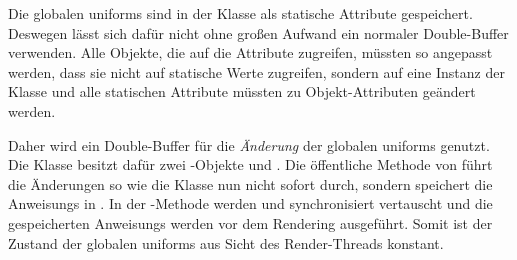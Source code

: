 Die globalen \glspl{uniform} sind in der Klasse  als statische Attribute gespeichert. Deswegen lässt sich dafür nicht ohne großen Aufwand ein normaler Double-Buffer verwenden. Alle Objekte, die auf die Attribute zugreifen, müssten so angepasst werden, dass sie nicht auf statische Werte zugreifen, sondern auf eine Instanz der Klasse und alle statischen Attribute müssten zu Objekt-Attributen geändert werden.

Daher wird ein Double-Buffer für die \emph{Änderung} der globalen \glspl{uniform} genutzt. Die Klasse  besitzt dafür zwei -Objekte  und . Die öffentliche Methode  von  führt die Änderungen so wie die Klasse  nun nicht sofort durch, sondern speichert die \glspl{Anweisung} in . In der -Methode werden  und  synchronisiert vertauscht und die gespeicherten \glspl{Anweisung} werden vor dem Rendering ausgeführt. Somit ist der Zustand der globalen \glspl{uniform} aus Sicht des Render-Threads konstant.

